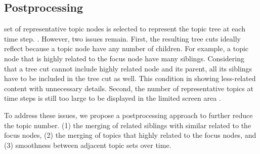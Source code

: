 
\subsection{Postprocessing}
 set of representative topic nodes is selected to represent the topic tree at each time step.
.
However, two issues remain.
First, the resulting tree cuts  ideally reflect  because a topic node  have any number of children.
For example, a topic node that is highly related to the focus node  have many  siblings.
Considering that a tree cut cannot  include  highly related node and its parent, all  its siblings have to be included in the tree cut as well.
This condition  in showing less-related content with unnecessary details.
Second, the number of representative topics at  time steps is still too large to be displayed in the limited screen area .


To address these issues, we propose a postprocessing approach to further reduce the topic number.
 (1)  the merging of related siblings with similar  related to the focus nodes, (2)  the merging of topics that  highly related to the focus nodes, and (3)  smoothness between adjacent topic sets over time.

